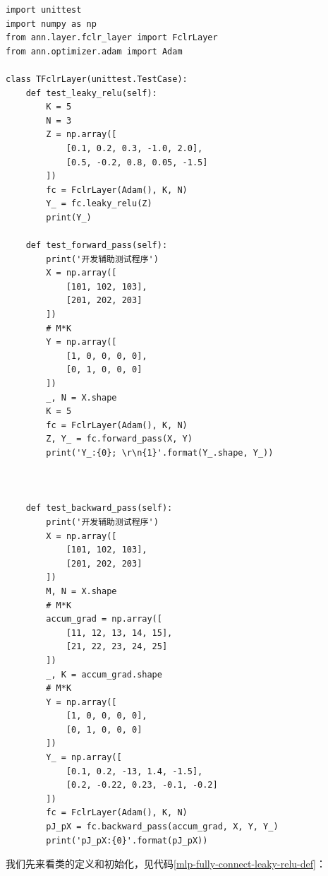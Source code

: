 \documentclass[UTF8]{article}
\begin{document}
\begin{lstlisting}
import unittest
import numpy as np
from ann.layer.fclr_layer import FclrLayer
from ann.optimizer.adam import Adam

class TFclrLayer(unittest.TestCase):
    def test_leaky_relu(self):
        K = 5
        N = 3
        Z = np.array([
            [0.1, 0.2, 0.3, -1.0, 2.0],
            [0.5, -0.2, 0.8, 0.05, -1.5]
        ])
        fc = FclrLayer(Adam(), K, N)
        Y_ = fc.leaky_relu(Z)
        print(Y_)

    def test_forward_pass(self):
        print('开发辅助测试程序')
        X = np.array([
            [101, 102, 103],
            [201, 202, 203]
        ])
        # M*K
        Y = np.array([
            [1, 0, 0, 0, 0],
            [0, 1, 0, 0, 0]
        ])
        _, N = X.shape
        K = 5
        fc = FclrLayer(Adam(), K, N)
        Z, Y_ = fc.forward_pass(X, Y)
        print('Y_:{0}; \r\n{1}'.format(Y_.shape, Y_))



    def test_backward_pass(self):
        print('开发辅助测试程序')
        X = np.array([
            [101, 102, 103],
            [201, 202, 203]
        ])
        M, N = X.shape
        # M*K
        accum_grad = np.array([
            [11, 12, 13, 14, 15],
            [21, 22, 23, 24, 25]
        ])
        _, K = accum_grad.shape
        # M*K
        Y = np.array([
            [1, 0, 0, 0, 0],
            [0, 1, 0, 0, 0]
        ])
        Y_ = np.array([
            [0.1, 0.2, -13, 1.4, -1.5],
            [0.2, -0.22, 0.23, -0.1, -0.2]
        ])
        fc = FclrLayer(Adam(), K, N)
        pJ_pX = fc.backward_pass(accum_grad, X, Y, Y_)
        print('pJ_pX:{0}'.format(pJ_pX))
\end{lstlisting}
我们先来看类的定义和初始化，见代码\ref{mlp-fully-connect-leaky-relu-def}：
\end{document}
